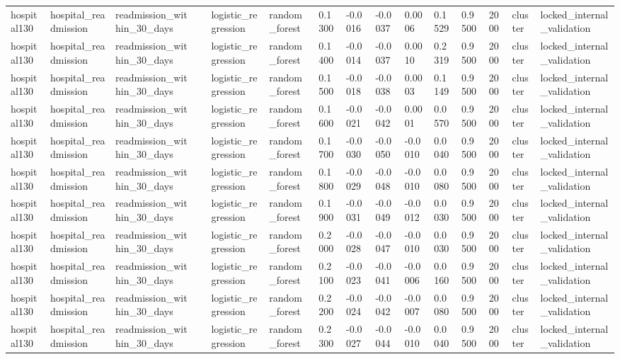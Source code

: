 \begin{tabular}{lllllllllllllll}
hospital130 & hospital\_readmission & readmission\_within\_30\_days &  & logistic\_regression & random\_forest & 0.1300 & -0.0016 & -0.0037 & 0.0006 & 0.1529 & 0.9500 & 2000 & cluster & locked\_internal\_validation \\
hospital130 & hospital\_readmission & readmission\_within\_30\_days &  & logistic\_regression & random\_forest & 0.1400 & -0.0014 & -0.0037 & 0.0010 & 0.2319 & 0.9500 & 2000 & cluster & locked\_internal\_validation \\
hospital130 & hospital\_readmission & readmission\_within\_30\_days &  & logistic\_regression & random\_forest & 0.1500 & -0.0018 & -0.0038 & 0.0003 & 0.1149 & 0.9500 & 2000 & cluster & locked\_internal\_validation \\
hospital130 & hospital\_readmission & readmission\_within\_30\_days &  & logistic\_regression & random\_forest & 0.1600 & -0.0021 & -0.0042 & 0.0001 & 0.0570 & 0.9500 & 2000 & cluster & locked\_internal\_validation \\
hospital130 & hospital\_readmission & readmission\_within\_30\_days &  & logistic\_regression & random\_forest & 0.1700 & -0.0030 & -0.0050 & -0.0010 & 0.0040 & 0.9500 & 2000 & cluster & locked\_internal\_validation \\
hospital130 & hospital\_readmission & readmission\_within\_30\_days &  & logistic\_regression & random\_forest & 0.1800 & -0.0029 & -0.0048 & -0.0010 & 0.0080 & 0.9500 & 2000 & cluster & locked\_internal\_validation \\
hospital130 & hospital\_readmission & readmission\_within\_30\_days &  & logistic\_regression & random\_forest & 0.1900 & -0.0031 & -0.0049 & -0.0012 & 0.0030 & 0.9500 & 2000 & cluster & locked\_internal\_validation \\
hospital130 & hospital\_readmission & readmission\_within\_30\_days &  & logistic\_regression & random\_forest & 0.2000 & -0.0028 & -0.0047 & -0.0010 & 0.0030 & 0.9500 & 2000 & cluster & locked\_internal\_validation \\
hospital130 & hospital\_readmission & readmission\_within\_30\_days &  & logistic\_regression & random\_forest & 0.2100 & -0.0023 & -0.0041 & -0.0006 & 0.0160 & 0.9500 & 2000 & cluster & locked\_internal\_validation \\
hospital130 & hospital\_readmission & readmission\_within\_30\_days &  & logistic\_regression & random\_forest & 0.2200 & -0.0024 & -0.0042 & -0.0007 & 0.0080 & 0.9500 & 2000 & cluster & locked\_internal\_validation \\
hospital130 & hospital\_readmission & readmission\_within\_30\_days &  & logistic\_regression & random\_forest & 0.2300 & -0.0027 & -0.0044 & -0.0010 & 0.0040 & 0.9500 & 2000 & cluster & locked\_internal\_validation \\

\end{tabular}
